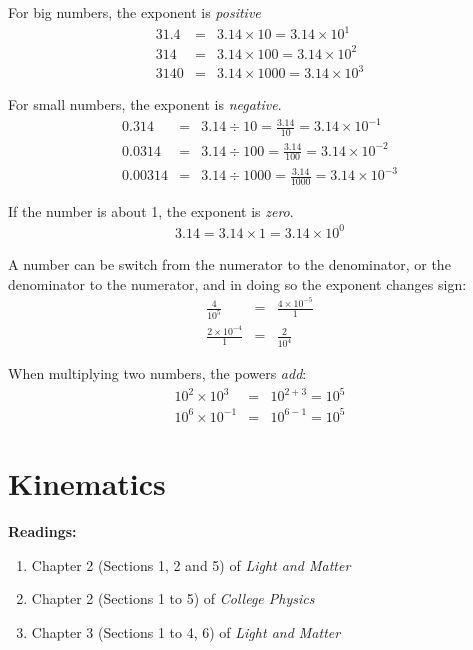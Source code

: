 \documentclass[12pt]{article}
\begin{document}
For big numbers, the exponent is \textit{positive}
\begin{eqnarray}
31.4 &=& 3.14 \times 10 = 3.14\times 10^1 \\
314 &=& 3.14 \times 100 = 3.14 \times 10^2 \\
3140 &=& 3.14 \times 1000 = 3.14 \times 10^3
\end{eqnarray}

For small numbers, the exponent is \textit{negative}. 
\begin{eqnarray}
0.314 &=& 3.14 \div 10 = \frac{3.14}{10} = 3.14 \times 10^{-1}\\
0.0314 &=& 3.14 \div 100 = \frac{3.14}{100} = 3.14\times 10^{-2} \\
0.00314 &=& 3.14 \div 1000 = \frac{3.14}{1000} = 3.14 \times 10^{-3}
\end{eqnarray}

If the number is about 1, the exponent is \textit{zero}.
\begin{eqnarray}
3.14 = 3.14 \times 1 = 3.14\times 10^0
\end{eqnarray}

A number can be switch from the numerator to the denominator, or the denominator to the numerator, and in doing so the exponent changes sign:
\begin{eqnarray}
\frac{4}{10^{5}} &=& \frac{4\times 10^{-5}}{1} \\
\frac{2\times 10^{-4}}{1} &=& \frac{2}{10^4}
\end{eqnarray}

When multiplying two numbers, the powers \textit{add}:
\begin{eqnarray}
10^{2}\times 10^{3} &=& 10^{2+3} = 10^5 \\
10^{6} \times 10^{-1} &=& 10^{6-1} = 10^5
\end{eqnarray}

\section{Kinematics}
	
\noindent \textbf{Readings:}
\begin{enumerate}
\item Chapter 2 (Sections 1, 2 and 5) of \textit{Light and Matter}
\item Chapter 2 (Sections 1 to 5) of \textit{College Physics}
\item Chapter 3 (Sections 1 to 4, 6) of \textit{Light and Matter}
\end{enumerate}
	
\end{document}
